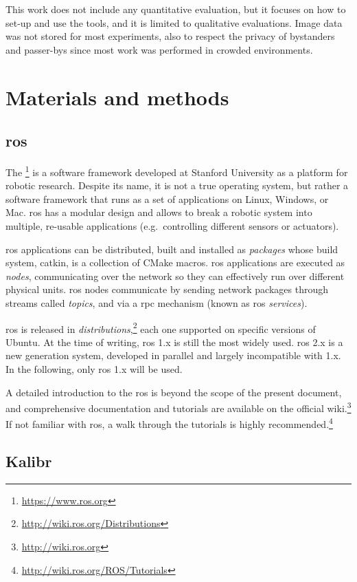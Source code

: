 \documentclass[11pt, letterpaper, twoside]{article}
\begin{document}
This work does not include any quantitative evaluation, but it focuses on how
to set-up and use the tools, and it is limited to qualitative evaluations.
Image data was not stored for most experiments, also to respect the privacy of
bystanders and passer-bys since most work was performed in crowded
environments.

\section{Materials and methods}

\subsection{\acs{ros}}

The \footnote{\url{https://www.ros.org}} is a software framework
developed at Stanford University as a platform for robotic research. Despite
its name, it is not a true operating system, but rather a software framework
that runs as a set of applications on Linux, Windows, or Mac. \gls{ros} has a
modular design and allows to break a robotic system into multiple, re-usable
applications (e.g.\ controlling different sensors or actuators).

\gls{ros} applications can be distributed, built and installed as
\textit{packages} whose build system, catkin, is a collection of CMake macros.
\gls{ros} applications are executed as \textit{nodes}, communicating over the
network so they can effectively run over different physical units. \gls{ros}
nodes communicate by sending network packages through streams called
\textit{topics}, and via a \gls{rpc} mechanism (known as \gls{ros}
\textit{services}).

\gls{ros} is released in
\textit{distributions},\footnote{\url{http://wiki.ros.org/Distributions}} each
one supported on specific versions of Ubuntu. At the time of writing, \gls{ros}
1.x is still the most widely used. \gls{ros} 2.x is a new generation system,
developed in parallel and largely incompatible with 1.x. In the following, only
\gls{ros} 1.x will be used.

A detailed introduction to the \gls{ros} is beyond the scope of the present
document, and comprehensive documentation and tutorials are available on the
official wiki.\footnote{\url{http://wiki.ros.org}} If not familiar with
\gls{ros}, a walk through the tutorials is highly
recommended.\footnote{\url{http://wiki.ros.org/ROS/Tutorials}}

\subsection{Kalibr}\label{sec:kalibr}
\end{document}
